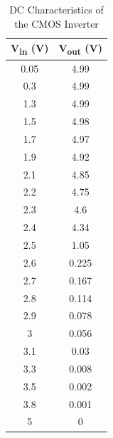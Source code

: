 \documentclass[12pt]{article}
\begin{document}
\begin{table}[h]
\centering  %
\begin{tabular}{|c | c |}                                                             
\hline  %
V\textsubscript{in} (V) & V\textsubscript{out} (V) \\  %
\hline  %
0.05 & 4.99 \\
0.3	& 4.99 \\
1.3	& 4.99 \\
1.5	& 4.98\\
1.7 & 4.97\\
1.9 & 4.92 \\
2.1 & 4.85\\
2.2 &	4.75\\
2.3	& 4.6\\
2.4	& 4.34\\
2.5	& 1.05\\
2.6	& 0.225\\
2.7	& 0.167\\
2.8	& 0.114\\
2.9	& 0.078\\
3	& 0.056\\
3.1	& 0.03\\
3.3	& 0.008\\
3.5	& 0.002\\
3.8	 & 0.001\\
5 &	0\\
\hline  %
\end{tabular}
\caption{DC Characteristics of the CMOS Inverter}
\label{table:demotable}
\end{table}
\clearpage
\end{document}
